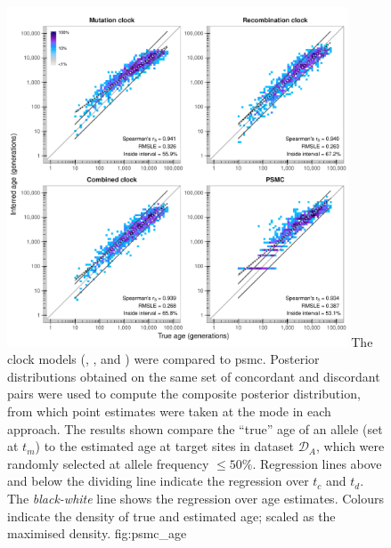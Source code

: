 

\begin{figure}[!htb]
\centering
\includegraphics[width=0.9\textwidth]{./img/ch5/psmc_age}
%
{The  clock models (\ClockM, \ClockR, and \ClockC) were compared to \gls{psmc}.
Posterior distributions obtained on the same set of concordant and discordant pairs were used to compute the composite posterior distribution, from which point estimates were taken at the mode in each approach.
The results shown compare the ``true'' age of an allele (set at $t_m$) to the estimated age at  target sites in dataset $\mathcal{D}_A$, which were randomly selected at allele frequency $\leq 50\%$.
Regression lines above and below the dividing line indicate the regression over $t_c$ and $t_d$.
The \emph{black-white} line shows the regression over age estimates.
Colours indicate the density of true and estimated age; scaled as the maximised density.}
{fig:psmc_age}
\end{figure}
